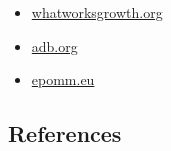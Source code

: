 \documentclass[
]{book}
\providecommand{\tightlist}{%
  \setlength{\itemsep}{0pt}\setlength{\parskip}{0pt}}
\begin{document}
\begin{itemize}
\tightlist
\item
  \href{https://whatworksgrowth.org/policy-reviews/transport/congestion-charging}{whatworksgrowth.org}
\item
  \href{https://www.adb.org/sites/default/files/publication/159940/introduction-congestion-charging.pdf}{adb.org}
\item
  \href{http://www.epomm.eu/newsletter/v2/content/2015/0415/doc/eupdate_en.pdf}{epomm.eu}
\end{itemize}

\hypertarget{references-4}{%
\subsection*{References}\label{references-4}}
\end{document}
